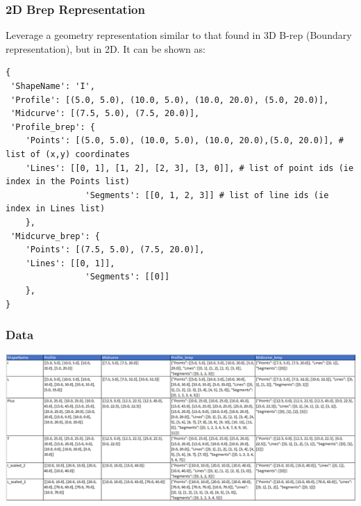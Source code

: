 \begin{frame}[fragile]\frametitle{2D Brep Representation}

Leverage a geometry representation similar to that found in 3D B-rep (Boundary representation), but in 2D. It can be shown as:

\begin{lstlisting}
{
 'ShapeName': 'I',
 'Profile': [(5.0, 5.0), (10.0, 5.0), (10.0, 20.0), (5.0, 20.0)],
 'Midcurve': [(7.5, 5.0), (7.5, 20.0)],
 'Profile_brep': {
    'Points': [(5.0, 5.0), (10.0, 5.0), (10.0, 20.0),(5.0, 20.0)], # list of (x,y) coordinates
    'Lines': [[0, 1], [1, 2], [2, 3], [3, 0]], # list of point ids (ie index in the Points list)
                'Segments': [[0, 1, 2, 3]] # list of line ids (ie index in Lines list)
    },
 'Midcurve_brep': {
    'Points': [(7.5, 5.0), (7.5, 20.0)],
    'Lines': [[0, 1]],
                'Segments': [[0]]
    },    
}
\end{lstlisting}	
\end{frame}

\begin{frame}[fragile]\frametitle{Data}

         \begin{center}
	\includegraphics[width=\linewidth]{images/shapes_csv}
	\label{fig_csv}
    \end{center}
	
\end{frame}


